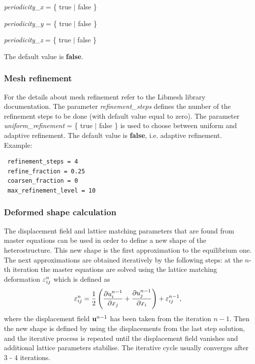 \textit{periodicity\_x} = \{ true $\vert$ false \}

\textit{periodicity\_y} = \{ true $\vert$ false \}

\textit{periodicity\_z} = \{ true $\vert$ false \}

The default value is {\bf false}.

\subsubsection{Mesh refinement}

For the details about mesh refinement refer to the Libmesh library documentation.
The parameter \textit{refinement\_steps } defines the number of the refinement steps to be done (with default value equal to zero). The parameter 
\textit{uniform\_refinement} = \{ true $\vert$ false \} is used to choose between uniform and adaptive refinement. The default value is {\bf false}, i.e. adaptive refinement. 
Example:
 \begin{verbatim}
 refinement_steps = 4
 refine_fraction = 0.25
 coarsen_fraction = 0
 max_refinement_level = 10
\end{verbatim}
 
\subsubsection{Deformed shape calculation}

The displacement field and lattice matching parameters that are found from
master equations can be used in order to define a new shape of the heterostructure. This new shape is the first approximation to the equilibrium one. The next approximations are obtained iteratively by the following steps: at the $n$-th iteration the master equations are solved using the lattice matching deformation ${\varepsilon}_{ij}^n$ which is defined as
\begin{equation}
\label{eps1}
{\varepsilon}_{ij}^n = \frac{1}{2}\left(\frac{\partial u_i^{n-1}}{\partial x_j} +
                               \frac{\partial u_j^{n-1}}{\partial x_i}\right)
+ {\varepsilon}_{ij}^{n-1},
\end{equation}
where the displacement field ${\bf u}^{n-1}$ has been taken from the iteration 
$n - 1$. 
Then the new shape is defined by using the displacements from the last step solution,
and the iterative process is repeated until the displacement field vanishes and additional lattice parameters stabilise. 
The iterative cycle usually converges after 3 - 4 iterations.

